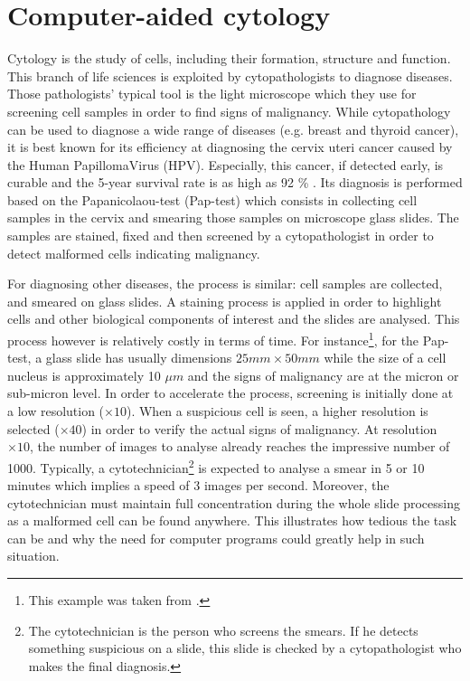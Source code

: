 \section{Computer-aided cytology}
\label{sec:cadc}
Cytology is the study of cells, including their formation, structure and function. This branch of life sciences is exploited by cytopathologists to diagnose diseases. Those pathologists' typical tool is the light microscope which they use for screening cell samples in order to find signs of malignancy. While cytopathology can be used to diagnose a wide range of diseases (e.g. breast and thyroid cancer), it is best known for its efficiency at diagnosing the cervix uteri cancer caused by the Human PapillomaVirus (HPV). Especially, this cancer, if detected early, is curable and the 5-year survival rate is as high as 92 \% \cite{bengtsson2014screening}. Its diagnosis is performed based on the Papanicolaou-test (Pap-test) which consists in collecting cell samples in the cervix and smearing those samples on microscope glass slides. The samples are stained, fixed and then screened by a cytopathologist in order to detect malformed cells indicating malignancy. 

For diagnosing other diseases, the process is similar: cell samples are collected, and smeared on glass slides. A staining process is applied in order to highlight cells and other biological components of interest and the slides are analysed. This process however is relatively costly in terms of time. For instance\footnote{This example was taken from \cite{bengtsson2014screening}.}, for the Pap-test, a glass slide has usually dimensions $25mm \times 50mm$ while the size of a cell nucleus is approximately 10 $\mu m$ and the signs of malignancy are at the micron or sub-micron level. In order to accelerate the process, screening is initially done at a low resolution ($\times 10$). When a suspicious cell is seen, a higher resolution is selected ($\times 40$) in order to verify the actual signs of malignancy. 
At resolution $\times 10$, the number of images to analyse already reaches the impressive number of 1000. Typically, a cytotechnician\footnote{The cytotechnician is the person who screens the smears. If he detects something suspicious on a slide, this slide is checked by a cytopathologist who makes the final diagnosis.} is expected to analyse a smear in 5 or 10 minutes which implies a speed of 3 images per second. Moreover, the cytotechnician must maintain full concentration during the whole slide processing as a malformed cell can be found anywhere. This illustrates how tedious the task can be and why the need for computer programs could greatly help in such situation. 

